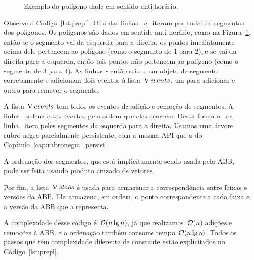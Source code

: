 \documentclass[main.tex]{subfiles}
\begin{document}
\begin{figure}
\centering
{}
\caption{Exemplo do polígono dado em sentido anti-horário.} \label{fig:exemplo_anti}
\end{figure}

Observe o Código~\ref{lst:prepl}. Os s das linhas~ e~ iteram por todos os segmentos dos polígonos. Os polígonos são dados em sentido anti-horário, como na Figura~\ref{fig:exemplo_anti}, então se o segmento vai da esquerda para a direita, os pontos imediatamente acima dele pertencem ao polígono (como o segmento de 1 para 2), e se vai da direita para a esquerda, então tais pontos não pertencem ao polígono (como o segmento de 3 para 4). As linhas~\mbox{-} então criam um objeto de segmento corretamente e adicionam dois eventos à lista~$\operatorname{V}{events}$, um para adicionar e outro para remover o segmento.

A lista~$\operatorname{V}{events}$ tem todos os eventos de adição e remoção de segmentos. A linha~ ordena esses eventos pela ordem que eles ocorrem. Dessa forma o~ da linha~ itera pelos segmentos da esquerda para a direita. Usamos uma árvore rubro-negra parcialmente persistente, com a mesma API que a do Capítulo~\ref{cap:rubronegra_persist}.

A ordenação dos segmentos, que está implicitamente sendo usada pela ABB, pode ser feita usando produto cruzado de vetores.

Por fim, a lista~$\operatorname{V}{slabs}$ é usada para armazenar a correspondência entre faixas e versões da ABB. Ela armazena, em ordem, o ponto correspondente a cada faixa e a versão da ABB que a representa.

A complexidade desse código é~$\mathcal{O}(n \lg n)$, já que realizamos~$\mathcal{O}(n)$ adições e remoções à ABB, e a ordenação também consome tempo~$\mathcal{O}(n \lg n)$. Todos os passos que têm complexidade diferente de constante estão explicitados no Código~\ref{lst:prepl}.
\end{document}
